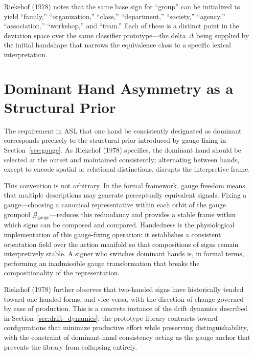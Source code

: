 \documentclass[11pt,a4paper]{article}
\theoremstyle{definition}
\theoremstyle{remark}
\begin{document}
Riekehof (1978) notes that the same base sign for ``group'' can be initialized to yield ``family,'' ``organization,'' ``class,'' ``department,'' ``society,'' ``agency,'' ``association,'' ``workshop,'' and ``team.'' Each of these is a distinct point in the deviation space over the same classifier prototype---the delta $\Delta$ being supplied by the initial handshape that narrows the equivalence class to a specific lexical interpretation.

\section{Dominant Hand Asymmetry as a Structural Prior}
\label{sec:asl_handedness}

The requirement in ASL that one hand be consistently designated as dominant corresponds precisely to the structural prior introduced by gauge fixing in Section~\ref{sec:gauge}. As Riekehof (1978) specifies, the dominant hand should be selected at the outset and maintained consistently; alternating between hands, except to encode spatial or relational distinctions, disrupts the interpretive frame.

This convention is not arbitrary. In the formal framework, gauge freedom means that multiple descriptions may generate perceptually equivalent signals. Fixing a gauge---choosing a canonical representative within each orbit of the gauge groupoid $\mathcal{G}_{\mathrm{gauge}}$---reduces this redundancy and provides a stable frame within which signs can be composed and compared. Handedness is the physiological implementation of this gauge-fixing operation: it establishes a consistent orientation field over the action manifold so that compositions of signs remain interpretively stable. A signer who switches dominant hands is, in formal terms, performing an inadmissible gauge transformation that breaks the compositionality of the representation.

Riekehof (1978) further observes that two-handed signs have historically tended toward one-handed forms, and vice versa, with the direction of change governed by ease of production. This is a concrete instance of the drift dynamics described in Section~\ref{sec:drift_dynamics}: the prototype library contracts toward configurations that minimize productive effort while preserving distinguishability, with the constraint of dominant-hand consistency acting as the gauge anchor that prevents the library from collapsing entirely.
\end{document}
